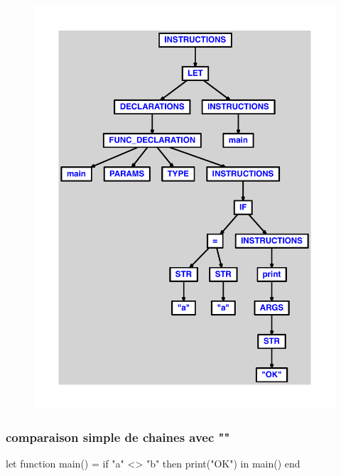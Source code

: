 \documentclass{article}
\begin{document}
\begin{figure}[H]\centering\includegraphics[max width=\textwidth]{ast/ast_179.pdf}\end{figure}\subsubsection{comparaison simple de chaines avec ""}
\begin{verbatimtab}
let
	function main() =
		if "a" <> "b" then print("OK")
in main() end
\end{verbatimtab}
\end{document}
